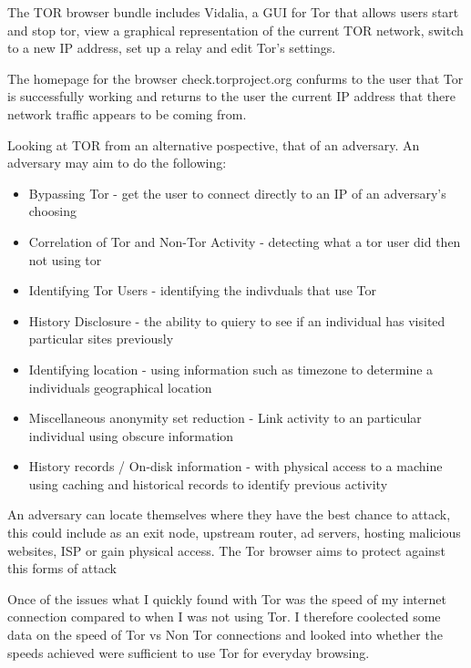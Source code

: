 \documentclass[12pt,a4paper,oneside]{article}
\begin{document}
{\begin{itemize}
\end{itemize}

The TOR browser bundle includes Vidalia, a GUI for Tor that allows users start and stop tor, view a graphical representation of the current TOR network, switch to a new IP address, set up a relay and edit Tor's settings.

The homepage for the browser check.torproject.org confurms to the user that Tor is successfully working and returns to the user the current IP address that there network traffic appears to be coming from.

Looking at TOR from an alternative pospective, that of an adversary. An adversary may aim to do the following:
\begin{itemize}
\item Bypassing Tor - get the user to connect directly to an IP of an adversary's choosing
\item Correlation of Tor and Non-Tor Activity - detecting what a tor user did then not using tor
\item Identifying Tor Users - identifying the indivduals that use Tor
\item History Disclosure - the ability to quiery to see if an individual has visited particular sites previously
\item Identifying location - using information such as timezone to determine a individuals geographical location
\item Miscellaneous anonymity set reduction - Link activity to an particular individual using obscure information
\item History records / On-disk information - with physical access to a machine using caching and historical records to identify previous activity
\end{itemize}

An adversary can locate themselves where they have the best chance to attack, this could include as an exit node, upstream router, ad servers, hosting malicious websites, ISP or gain physical access. The Tor browser aims to protect against this forms of attack 

Once of the issues what I quickly found with Tor was the speed of my internet connection compared to when I was not using Tor. I therefore coolected some data on the speed of Tor vs Non Tor connections and looked into whether the speeds achieved were sufficient to use Tor for everyday browsing.  

}
\end{document}

